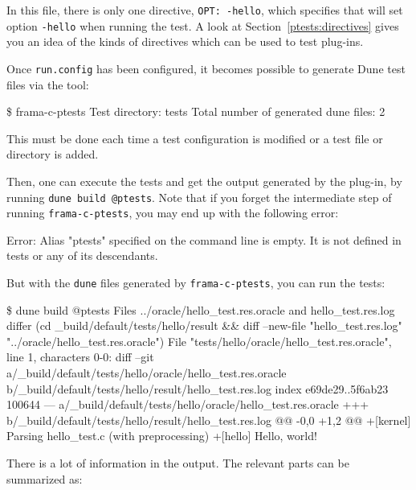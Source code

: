 In this file, there is only one directive,
\texttt{OPT: -hello}, which specifies that
\framac will set option \texttt{-hello} when running the test.
A look at Section~\ref{ptests:directives} gives you an idea of the kinds of
directives which can be used to test plug-ins.

Once \texttt{run.config} has been configured, it becomes possible to generate
Dune test files via the \ptests tool:

\begin{shell}[breaklines=true]
\$ frama-c-ptests
Test directory: tests
Total number of generated dune files: 2
\end{shell}

This must be done each time a test configuration is modified or a test file or
directory is added.

Then, one can execute the tests and get the output generated by the plug-in,
by running \verb|dune build @ptests|. Note that if you forget the intermediate
step of running \verb|frama-c-ptests|, you may end up with the following error:

\begin{logs}[breaklines=true]
Error: Alias "ptests" specified on the command line is empty.
It is not defined in tests or any of its descendants.
\end{logs}

But with the \texttt{dune} files generated by \verb|frama-c-ptests|, you can
run the tests:

\begin{frama-c-commands}[breaklines=true]
\$ dune build @ptests
Files ../oracle/hello_test.res.oracle and hello_test.res.log differ
(cd _build/default/tests/hello/result && diff --new-file "hello_test.res.log"
"../oracle/hello_test.res.oracle")
File "tests/hello/oracle/hello_test.res.oracle", line 1, characters 0-0:
diff --git a/_build/default/tests/hello/oracle/hello_test.res.oracle
            b/_build/default/tests/hello/result/hello_test.res.log
index e69de29..5f6ab23 100644
--- a/_build/default/tests/hello/oracle/hello_test.res.oracle
+++ b/_build/default/tests/hello/result/hello_test.res.log
@@ -0,0 +1,2 @@
+[kernel] Parsing hello_test.c (with preprocessing)
+[hello] Hello, world!
\end{frama-c-commands}

There is a lot of information in the output. The relevant parts
can be summarized as:

